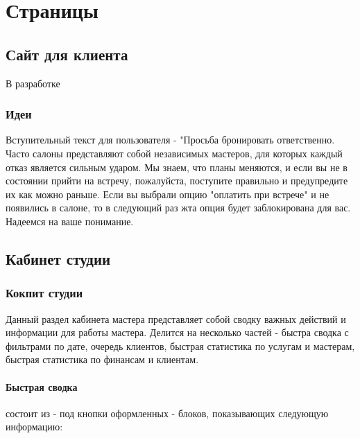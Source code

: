 \documentclass[DIV=calc, paper=a4, fontsize=11pt]{scrartcl} %
\begin{document}
\subsection{}


\section{Страницы}

\subsection{Сайт для клиента}

В разработке

\subsubsection{Идеи}

Вступительный текст для пользователя - "Просьба бронировать ответственно. Часто салоны представляют собой независимых мастеров, для которых каждый отказ является сильным ударом. Мы знаем, что планы меняются, и если вы не в состоянии прийти на встречу, пожалуйста, поступите правильно и предупредите их как можно раньше. Если вы выбрали опцию "оплатить при встрече" и не появились в салоне, то в следующий раз жта опция будет заблокирована для вас. Надеемся на ваше понимание.

\subsection{Кабинет студии}

\subsubsection{Кокпит студии}
Данный раздел кабинета мастера представляет собой сводку важных действий и информации для работы мастера. Делится на несколько частей - быстра сводка с фильтрами по дате, очередь клиентов, быстрая статистика по услугам и мастерам, быстрая статистика по финансам и клиентам.

\paragraph{Быстрая сводка} 
состоит из - под кнопки оформленных - блоков, показывающих следующую информацию:
\end{document}
